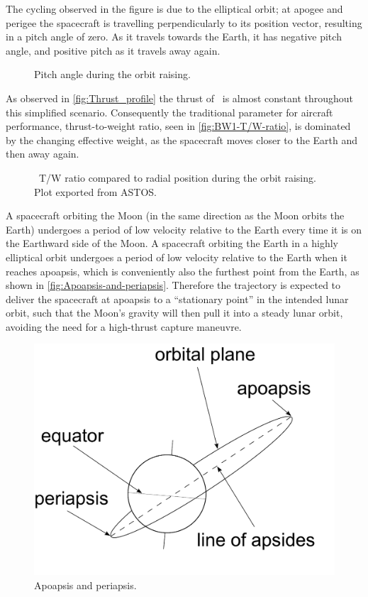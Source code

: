 The cycling observed in the figure is due to the elliptical orbit; at apogee and perigee the spacecraft is travelling perpendicularly to its position vector, resulting in a pitch angle of zero. As it travels towards the Earth, it has negative pitch angle, and positive pitch as it travels away again.
 
\begin{figure}
\caption{Pitch angle during the orbit raising.}
\label{fig:BW1-Pitch}
\centering
\end{figure}

As observed in \autoref{fig:Thrust_profile} the thrust of \BW\ is almost constant throughout this simplified scenario. Consequently the traditional parameter for aircraft performance, thrust-to-weight ratio, seen in \autoref{fig:BW1-T/W-ratio}, is dominated by the changing effective weight, as the spacecraft moves closer to the Earth and then away again.

\begin{figure}
\caption{\BW\ T/W ratio compared to radial position during the orbit raising. Plot exported from ASTOS.}
\label{fig:BW1-T/W-ratio}\centering
\end{figure}

A spacecraft orbiting the Moon (in the same direction as the Moon orbits the Earth) undergoes a period of low velocity relative to the Earth every time it is on the Earthward side of the Moon. A spacecraft orbiting the Earth in a highly elliptical orbit undergoes a period of low velocity relative to the Earth when it reaches apoapsis, which is conveniently also the furthest point from the Earth, as shown in \autoref{fig:Apoapsis-and-periapsis}. Therefore the trajectory is expected to deliver the spacecraft at apoapsis to a \enquote{stationary point} in the intended lunar orbit, such that the Moon's gravity will then pull it into a steady lunar orbit, avoiding the need for a high-thrust capture maneuvre.

\begin{figure}
\caption{Apoapsis and periapsis.}
\label{fig:Apoapsis-and-periapsis}
\centering
\includegraphics[scale=0.4]{Images/apsides.pdf}
\end{figure}

